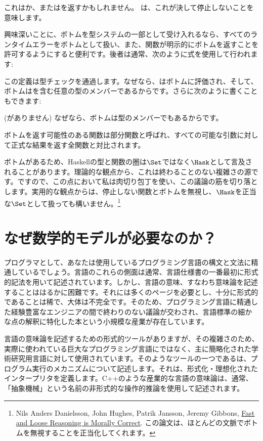 これはか、または\code{\_|\_}を返すかもしれません。
\code{\_|\_}は、これが決して停止しないことを意味します。

興味深いことに、ボトムを型システムの一部として受け入れるなら、すべてのランタイムエラーをボトムとして扱い、また、関数が明示的にボトムを返すことを許可するようにすると便利です。後者は通常、次のように式を使用して行われます: 

この定義は型チェックを通過します。なぜなら、はボトムに評価され、そして、ボトムはを含む任意の型のメンバーであるからです。さらに次のように書くこともできます: 

 (がありません) なぜなら、ボトムは型のメンバーでもあるからです。

ボトムを返す可能性のある関数は部分関数と呼ばれ、すべての可能な引数に対して正式な結果を返す全関数と対比されます。

ボトムがあるため、Haskellの型と関数の圏は$\Set$ではなく$\Hask$として言及されることがあります。理論的な観点から、これは終わることのない複雑さの源です。ですので、この点において私は肉切り包丁を使い、この議論の筋を切り落とします。実用的な観点からは、停止しない関数とボトムを無視し、$\Hask$を正当な$\Set$として扱っても構いません。\footnote{Nils Anders Danielsson,
  John Hughes, Patrik Jansson, Jeremy Gibbons, \href{http://www.cs.ox.ac.uk/jeremy.gibbons/publications/fast+loose.pdf}{
    Fast and Loose Reasoning is Morally Correct}. この論文は、ほとんどの文脈でボトムを無視することを正当化してくれます。}

\section{なぜ数学的モデルが必要なのか？}

プログラマとして、あなたは使用しているプログラミング言語の構文と文法に精通しているでしょう。言語のこれらの側面は通常、言語仕様書の一番最初に形式的記法を用いて記述されています。しかし、言語の意味、すなわち意味論を記述することははるかに困難です。それには多くのページを必要とし、十分に形式的であることは稀で、大体は不完全です。そのため、プログラミング言語に精通した経験豊富なエンジニアの間で終わりのない議論が交わされ、言語標準の細かな点の解釈に特化した本という小規模な産業が存在しています。

言語の意味論を記述するための形式的ツールがありますが、その複雑さのため、実際に使われている巨大なプログラミング言語にではなく、主に簡略化された学術研究用言語に対して使用されています。そのようなツールの一つであるは、プログラム実行のメカニズムについて記述します。それは、形式化・理想化されたインタープリタを定義します。C++のような産業的な言語の意味論は、通常、「抽象機械」という名前の非形式的な操作的推論を使用して記述されます。

